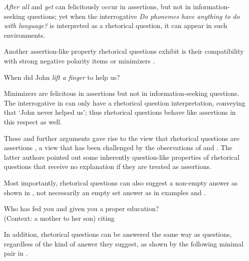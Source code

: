 \documentclass[output=paper,colorlinks,citecolor=brown            ,chinesefont]{langscibook}
\begin{document}
\textit{After all} and \textit{yet} can felicitously occur in assertions, but not in information-seeking questions; yet when the interrogative \textit{Do phonemes have anything to do with language?} is interpreted as a rhetorical question, it can appear in such environments.

Another assertion-like property rhetorical questions exhibit is their compatibility with strong negative polarity items or minimizers \citep{Han2002, Abels2003, Guerzoni2004, Biezma+2017}.

\begin{exe}
\ex\label{min} When did John \textit{lift a finger} to help us?
\end{exe}

Minimizers are felicitous in assertions but not in information-seeking questions. The interrogative in  can only have a rhetorical question interpretation, conveying that `John never helped us'; thus rhetorical questions behave like assertions in this respect as well. 

These and further arguments gave rise to the view that rhetorical questions are assertions \citep{Han2002}, a view that has been challenged by the observations of \citet{Rohde2006} and \citet{Caponigro+2007}. The latter authors pointed out some inherently question-like properties of rhetorical questions that receive no explanation if they are treated as assertions. 

Most importantly, rhetorical questions can also suggest a non-empty answer as shown in , not necessarily an empty set answer as in examples  and . 

\begin{exe}
\ex\label{RQ+} Who has fed you and given you a proper education?\\
(Context: a mother to her son) \hfill \citet{Rohde2006} citing \citet{Han1998}
\end{exe}

In addition, rhetorical questions can be answered the same way as questions, regardless of the kind of answer they suggest, as shown by the following minimal pair in .
\end{document}
